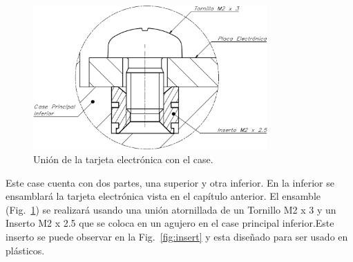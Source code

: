 \begin{figure}[hbt!]
\centering
\includegraphics[width=0.8\textwidth]{union_atornillada.pdf}
\caption{Unión de la tarjeta electrónica con el case.}
\label{fig:ensamble_principal}
\end{figure}


\newpage

Este case cuenta con dos partes, una superior y otra inferior. En la inferior se ensamblará la tarjeta electrónica vista en el capítulo anterior. El ensamble (Fig.~\ref{fig:ensamble_principal}) se realizará usando una unión atornillada de un Tornillo M2 x 3 y un Inserto M2 x 2.5 que se coloca en un agujero en el case principal inferior.Este  inserto se puede observar en la Fig.~\ref{fig:insert} y esta diseñado para ser usado en plásticos.

\vspace{5mm}

